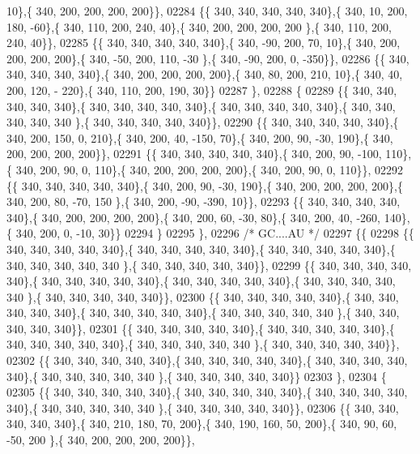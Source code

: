 \begin{DoxyCode}
      10\},\{ 340, 200, 200, 200, 200\}\},
02284 \{\{ 340, 340, 340, 340, 340\},\{ 340,  10, 200, 180, -60\},\{ 340, 110, 200, 240,  40\},\{ 340, 200, 200, 200, 200
      \},\{ 340, 110, 200, 240,  40\}\},
02285 \{\{ 340, 340, 340, 340, 340\},\{ 340, -90, 200,  70,  10\},\{ 340, 200, 200, 200, 200\},\{ 340, -50, 200, 110, -30
      \},\{ 340, -90, 200,   0, -350\}\},
02286 \{\{ 340, 340, 340, 340, 340\},\{ 340, 200, 200, 200, 200\},\{ 340,  80, 200, 210,  10\},\{ 340,  40, 200, 120, -
      220\},\{ 340, 110, 200, 190,  30\}\}
02287 \},
02288 \{
02289 \{\{ 340, 340, 340, 340, 340\},\{ 340, 340, 340, 340, 340\},\{ 340, 340, 340, 340, 340\},\{ 340, 340, 340, 340, 340
      \},\{ 340, 340, 340, 340, 340\}\},
02290 \{\{ 340, 340, 340, 340, 340\},\{ 340, 200, 150,   0, 210\},\{ 340, 200,  40, -150,  70\},\{ 340, 200,  90, -30, 
      190\},\{ 340, 200, 200, 200, 200\}\},
02291 \{\{ 340, 340, 340, 340, 340\},\{ 340, 200,  90, -100, 110\},\{ 340, 200,  90,   0, 110\},\{ 340, 200, 200, 200, 
      200\},\{ 340, 200,  90,   0, 110\}\},
02292 \{\{ 340, 340, 340, 340, 340\},\{ 340, 200,  90, -30, 190\},\{ 340, 200, 200, 200, 200\},\{ 340, 200,  80, -70, 150
      \},\{ 340, 200, -90, -390,  10\}\},
02293 \{\{ 340, 340, 340, 340, 340\},\{ 340, 200, 200, 200, 200\},\{ 340, 200,  60, -30,  80\},\{ 340, 200,  40, -260, 
      140\},\{ 340, 200,   0, -10,  30\}\}
02294 \}
02295 \},
02296 \textcolor{comment}{/* GC....AU */}
02297 \{\{
02298 \{\{ 340, 340, 340, 340, 340\},\{ 340, 340, 340, 340, 340\},\{ 340, 340, 340, 340, 340\},\{ 340, 340, 340, 340, 340
      \},\{ 340, 340, 340, 340, 340\}\},
02299 \{\{ 340, 340, 340, 340, 340\},\{ 340, 340, 340, 340, 340\},\{ 340, 340, 340, 340, 340\},\{ 340, 340, 340, 340, 340
      \},\{ 340, 340, 340, 340, 340\}\},
02300 \{\{ 340, 340, 340, 340, 340\},\{ 340, 340, 340, 340, 340\},\{ 340, 340, 340, 340, 340\},\{ 340, 340, 340, 340, 340
      \},\{ 340, 340, 340, 340, 340\}\},
02301 \{\{ 340, 340, 340, 340, 340\},\{ 340, 340, 340, 340, 340\},\{ 340, 340, 340, 340, 340\},\{ 340, 340, 340, 340, 340
      \},\{ 340, 340, 340, 340, 340\}\},
02302 \{\{ 340, 340, 340, 340, 340\},\{ 340, 340, 340, 340, 340\},\{ 340, 340, 340, 340, 340\},\{ 340, 340, 340, 340, 340
      \},\{ 340, 340, 340, 340, 340\}\}
02303 \},
02304 \{
02305 \{\{ 340, 340, 340, 340, 340\},\{ 340, 340, 340, 340, 340\},\{ 340, 340, 340, 340, 340\},\{ 340, 340, 340, 340, 340
      \},\{ 340, 340, 340, 340, 340\}\},
02306 \{\{ 340, 340, 340, 340, 340\},\{ 340, 210, 180,  70, 200\},\{ 340, 190, 160,  50, 200\},\{ 340,  90,  60, -50, 200
      \},\{ 340, 200, 200, 200, 200\}\},

\end{DoxyCode}
